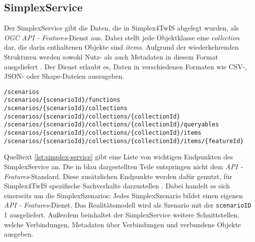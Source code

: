 \subsection{SimplexService}
\label{sec:simplex-service}

Der SimplexService gibt die Daten, die in Simplex4TwIS abgelegt wurden, als \textit{OGC API - Features}-Dienst aus. Dabei stellt jede Objektklasse eine \textit{collection} dar, die darin enthaltenen Objekte sind \textit{items}. Aufgrund der wiederkehrenden Strukturen werden sowohl Nutz- als auch Metadaten in diesem Format ausgeliefert \parencite{grossmannEnvVisioService2022}. Der Dienst erlaubt es, Daten in verschiedenen Formaten wie \acs{CSV}-, \acs{JSON}- oder Shape-Dateien auszugeben.

\begin{lstlisting}[float=!ht,language=simplexservice,caption={[Ausgewählte Endpunkte des SimplexService]Ausgewählte Endpunkte des SimplexService. Schwarz dargestellte Abschnitte sind Teil des \textit{OGC API - Features}-Standard, während die blauen Teile vom SimplexService hinzugefügt wurden. \parencite{simplex4datagmbhSimplexServiceDokumenation}},label=lst:simplex-service]
/scenarios
/scenarios/{scenarioId}/functions
/scenarios/{scenarioId}/collections
/scenarios/{scenarioId}/collections/{collectionId}
/scenarios/{scenarioId}/collections/{collectionId}/queryables
/scenarios/{scenarioId}/collections/{collectionId}/items
/scenarios/{scenarioId}/collections/{collectionId}/items/{featureId}
\end{lstlisting}

Quelltext \ref{lst:simplex-service} gibt eine Liste von wichtigen Endpunkten des SimplexService an. Die in blau dargestellten Teile entspringen nicht dem \textit{API - Features}-Standard. Diese zusätzlichen Endpunkte werden dafür genutzt, für Simplex4TwIS spezifische Sachverhalte darzustellen \parencite{grossmannEnvVisioService2022}. Dabei handelt es sich einerseits um die SimplexSzenarios: Jedes SimplexSzenario bildet einen eigenen \textit{API - Features}-Dienst. Das Realitätsmodell wird als Szenario mit der \texttt{scenarioID} 1 ausgeliefert. Außerdem beinhaltet der SimplexService weitere Schnittstellen, welche Verbindungen, Metadaten über Verbindungen und verbundene Objekte ausgeben.

